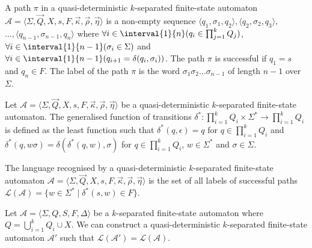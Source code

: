 \begin{definition}
	A path $\pi$ in a quasi-deterministic $k$-separated finite-state
	automaton $\mathcal{A} = \langle \Sigma, \vec{Q}, X, s, F, \vec{\kappa},
	\vec{\rho}, \vec{\eta} \rangle$ is a non-empty sequence
	$\langle q_1, \sigma_1, q_2 \rangle, \langle q_2, \sigma_2, q_3 \rangle,$\\
	$\dots, \langle q_{n-1}, \sigma_{n-1},
	q_n \rangle$ where $\forall i \in \interval{1}{n}(q_i \in
	\prod_{j=1}^k{Q_j})$, $\forall i \in
	\interval{1}{n-1} (\sigma_i \in \Sigma)$ and $\forall i \in
	\interval{1}{n-1} (q_{i+1} =
	\delta(q_i, \sigma_i))$. The path $\pi$ is successful if $q_1 = s$
	and $q_n \in F$. The label of the path $\pi$ is the word
	$\sigma_1\sigma_2\ldots\sigma_{n-1}$ of length $n-1$ over $\Sigma$.
\end{definition}

\begin{definition}
	Let $\mathcal{A} = \langle \Sigma, \vec{Q}, X, s, F, \vec{\kappa},
	\vec{\rho}, \vec{\eta} \rangle$
	be a quasi-deterministic $k$-separated finite-state automaton. The
	generalised function of transitions $\delta^* : \prod_{i=1}^k{Q_i}
	\times \Sigma^* \rightarrow \prod_{i=1}^k{Q_i}$ is defined as the least
	function such that $\delta^*(q, \epsilon) = q$ for $q \in
	\prod_{i=1}^k{Q_i}$ and $\delta^*(q, w\sigma) = \delta(\delta^*(q, w),
	\sigma)$ for $q \in \prod_{i=1}^k{Q_i}$, $w \in \Sigma^*$ and $\sigma \in
	\Sigma$.
\end{definition}

\begin{definition}
	The language recognised by a quasi-deterministic $k$-separated finite-state
	automaton $\mathcal{A} = \langle \Sigma, \vec{Q}, X, s, F, \vec{\kappa},
	\vec{\rho}, \vec{\eta} \rangle$ is the set of all labels of successful
	paths $\mathcal{L}(\mathcal{A}) = \{ w \in \Sigma^* \mid \delta^*(s, w) \in
	F \}$.
\end{definition}

\begin{theorem}
	Let $\mathcal{A} = \langle \Sigma, Q, S, F, \Delta \rangle$ be a
	$k$-separated finite-state automaton where $Q = \bigcup_{i=1}^k{Q_i}
	\cup X$. We can construct a quasi-deterministic $k$-separated
	finite-state automaton $\mathcal{A'}$ such that $\mathcal{L}
	(\mathcal{A'} ) = \mathcal{L} ( \mathcal{A} )$.
\end{theorem}

